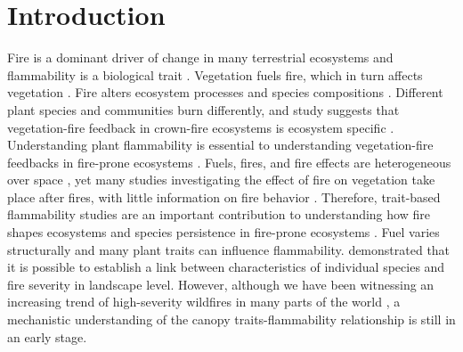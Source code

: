 \documentclass[12pt]{report}
\begin{document}
\section{Introduction}

Fire is a dominant driver of change in many terrestrial ecosystems and flammability is a biological trait \citep{pausas2012flammability}. Vegetation fuels fire, which in turn affects vegetation \citep{bova2005linking, jones2006prediction, kavanagh2010way,o2010acute, michaletz2012moving, west2016experimental, lodge2018xylem, bar2019fire}. Fire alters ecosystem processes \citep{debano1978effect, debano1998fire, grogan2000fire,wan2001fire, keane2008ecological, roces2022global,ojima1994long} and species compositions \citep{cochrane2003fire,cleary2004changes, laurance2003slow}. Different plant species and communities burn differently, and study suggests that vegetation-fire feedback in crown-fire ecosystems is ecosystem specific \citep{pausas2004plant}. 
Understanding plant flammability is essential to understanding vegetation-fire feedbacks in fire-prone ecosystems \citep{pausas2012fire, pausas2017flammability}. Fuels, fires, and fire effects are heterogeneous over space \citep{gagnon2010does}, yet many studies investigating the effect of fire on vegetation take place after fires, with little information on fire behavior \citep{o2018advances}. Therefore, trait-based flammability studies are an important contribution to understanding how fire shapes ecosystems and species persistence in fire-prone ecosystems \citep{pausas2012fire, pausas2017flammability}. Fuel varies structurally and many plant traits can influence flammability. \citet{schwilk2011scaling} demonstrated that it is possible to establish a link between characteristics of individual species  and fire severity in landscape level. However, although we have been witnessing an increasing trend of high-severity wildfires in many parts of the world \citep{miller2012trends, dennison2014large, weber2020spatiotemporal, salguero2020wildfire}, a mechanistic understanding of the canopy traits-flammability relationship is still in an early stage.\\
\end{document}
